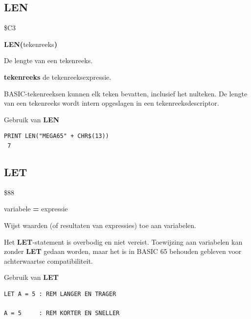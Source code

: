 \subsection{LEN}
\begin{description}[leftmargin=2cm,style=nextline]
\item [Token:]    \$C3

\item [Formaat:]   {\bf LEN(}tekenreeks{\bf)}

\item [Retourneert:]  De lengte van een tekenreeks.

                  {\bf tekenreeks} de tekenreeksexpressie.

\item [Opmerkingen:]  BASIC-tekenreeksen kunnen elk teken bevatten, inclusief het nulteken. De lengte van een tekenreeks wordt intern opgeslagen in een tekenreeksdescriptor.

\item [Voorbeeld:]  Gebruik van {\bf LEN}

\begin{tcolorbox}[colback=black,coltext=white]
\verbatimfont{\codefont}
\begin{verbatim}
PRINT LEN("MEGA65" + CHR$(13))
 7
\end{verbatim}
\end{tcolorbox}
\end{description}


\newpage
\subsection{LET}
\begin{description}[leftmargin=2cm,style=nextline]
\item [Token:]    \$88

\item [Formaat:]   [{\bf LET}] variabele {\bf=} expressie

\item [Gebruik:]    Wijst waarden (of resultaten van expressies) toe aan variabelen.

\item [Opmerkingen:]  Het {\bf LET}-statement is overbodig en niet vereist. Toewijzing aan variabelen kan zonder {\bf LET} gedaan worden, maar het is in BASIC 65 behouden gebleven voor achterwaartse compatibiliteit.

\item [Voorbeelden:] Gebruik van {\bf LET}

\begin{tcolorbox}[colback=black,coltext=white]
\verbatimfont{\codefont}
\begin{verbatim}
LET A = 5 : REM LANGER EN TRAGER

A = 5     : REM KORTER EN SNELLER
\end{verbatim}
\end{tcolorbox}
\end{description}

